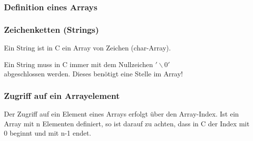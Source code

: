 		\begin{minipage}[t]{10.5 cm}
			\subsubsection{Definition eines Arrays }
				\vspace*{-0.3cm}
				
			\subsubsection{Zeichenketten (Strings) }
				\begin{compactitem}
					\item Ein String ist in C ein Array von Zeichen (char-Array).
					\item Ein String muss in C immer mit dem Nullzeichen $'\backslash0'$ \\
					abgeschlossen werden. Dieses benötigt eine Stelle im Array!					
				\end{compactitem}
				
		\end{minipage}	
		\begin{minipage}[t]{8.5 cm}
			\subsubsection{Zugriff auf ein Arrayelement }
				Der Zugriff auf ein Element eines Arrays erfolgt über den Array-Index. Ist ein Array mit n Elementen definiert, so ist darauf zu achten, dass in C der Index mit 0 beginnt und mit n-1 endet.
				
		\end{minipage}	

